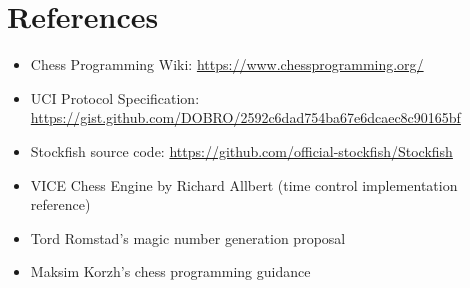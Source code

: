 \documentclass[11pt,a4paper]{report}
\begin{document}
\chapter{References}

\begin{itemize}
    \item Chess Programming Wiki: \url{https://www.chessprogramming.org/}
    \item UCI Protocol Specification: \url{https://gist.github.com/DOBRO/2592c6dad754ba67e6dcaec8c90165bf}
    \item Stockfish source code: \url{https://github.com/official-stockfish/Stockfish}
    \item VICE Chess Engine by Richard Allbert (time control implementation reference)
    \item Tord Romstad's magic number generation proposal
    \item Maksim Korzh's chess programming guidance
\end{itemize}

\end{document}
